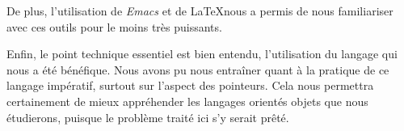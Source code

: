 \documentclass{article}
\begin{document}
De plus, l'utilisation de \textit{Emacs} et de \LaTeX nous a permis de nous familiariser avec ces outils pour le moins très puissants.

Enfin, le point technique essentiel est bien entendu, l'utilisation du langage qui nous a été bénéfique. Nous avons pu nous entraîner quant à la pratique de ce langage impératif, surtout sur l'aspect des pointeurs. Cela nous permettra certainement de mieux appréhender les langages orientés objets que nous étudierons, puisque le problème traité ici s'y serait prêté.
\end{document}
